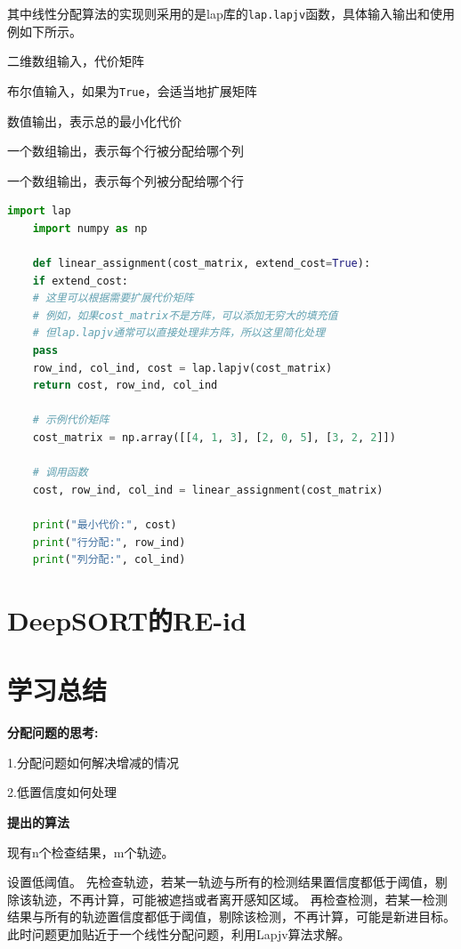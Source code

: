 其中线性分配算法的实现则采用的是lap库的\texttt{lap.lapjv}函数，具体输入输出和使用例如下所示。

\begin{description}[itemsep=-3pt,parsep=0pt,topsep=3pt]
	\item[cost\_matrix] 二维数组输入，代价矩阵
	\item[extend\_cost] 布尔值输入，如果为\texttt{True}，会适当地扩展矩阵
	\item[const] 数值输出，表示总的最小化代价
	\item[x] 一个数组输出，表示每个行被分配给哪个列
	\item[y] 一个数组输出，表示每个列被分配给哪个行
\end{description}


\begin{lstlisting}[language=Python, caption={lapjv example}, label={lst:pythonfile}]
	import lap
	import numpy as np
	
	def linear_assignment(cost_matrix, extend_cost=True):
	if extend_cost:
	# 这里可以根据需要扩展代价矩阵
	# 例如，如果cost_matrix不是方阵，可以添加无穷大的填充值
	# 但lap.lapjv通常可以直接处理非方阵，所以这里简化处理
	pass
	row_ind, col_ind, cost = lap.lapjv(cost_matrix)
	return cost, row_ind, col_ind
	
	# 示例代价矩阵
	cost_matrix = np.array([[4, 1, 3], [2, 0, 5], [3, 2, 2]])
	
	# 调用函数
	cost, row_ind, col_ind = linear_assignment(cost_matrix)
	
	print("最小代价:", cost)
	print("行分配:", row_ind)
	print("列分配:", col_ind)
\end{lstlisting}

\section{DeepSORT的RE-id}




\section{学习总结}
\textbf{分配问题的思考:}

1.分配问题如何解决增减的情况

2.低置信度如何处理

\textbf{提出的算法}

现有n个检查结果，m个轨迹。

设置低阈值。
先检查轨迹，若某一轨迹与所有的检测结果置信度都低于阈值，剔除该轨迹，不再计算，可能被遮挡或者离开感知区域。
再检查检测，若某一检测结果与所有的轨迹置信度都低于阈值，剔除该检测，不再计算，可能是新进目标。
此时问题更加贴近于一个线性分配问题，利用Lapjv算法求解。

